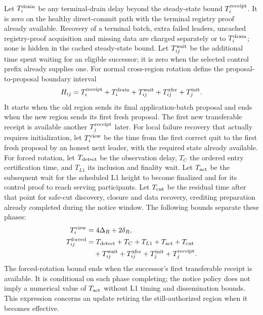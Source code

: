 \documentclass[11pt,a4paper,onecolumn]{article}
\begin{document}
Let $T_i^{\rm drain}$ be any terminal-drain delay beyond the steady-state bound $T_i^{\rm receipt}$.
It is zero on the healthy direct-commit path with the terminal registry
proof already available. Recovery of a terminal batch, extra failed leaders,
uncached registry-proof acquisition and missing data are charged separately
or to $T_i^{\rm drain}$; none is hidden in the cached steady-state bound.
Let $T_{ij}^{\rm wait}$ be the additional time spent waiting for an eligible
successor; it is zero when the selected control prefix already supplies one.
For normal cross-region rotation define the proposal-to-proposal boundary interval
\[
 H_{ij}=T_i^{\rm receipt}+T_i^{\rm drain}+T_{ij}^{\rm wait}+T_{ij}^{\rm xfer}+T_j^{\rm init}.
\]
It starts when the old region sends its final application-batch proposal
and ends when the new region sends its first fresh proposal. The first
new transferable receipt is available another $T_j^{\rm receipt}$ later.
For local failure recovery that actually requires initialization, let $T_i^{\rm view}$ be the time from the first
correct quit to the first fresh proposal by an honest next leader, with
the required state already available. For forced rotation, let
$T_{\rm detect}$ be the observation delay, $T_C$ the ordered entry
certification time, and $T_{L1}$ its inclusion and finality wait.
Let $T_{\rm act}$ be the subsequent wait for the scheduled L1 height to
become finalized and for its control proof to reach serving participants.
Let $T_{\rm cut}$ be the residual time after that point for safe-cut
discovery, closure and data recovery, crediting preparation already
completed during the notice window. The following bounds separate these phases:
\[
 \begin{aligned}
 T_i^{\rm view}&=4\Delta_R+2\delta_R,\\
 T_{ij}^{\rm forced}&=T_{\rm detect}+T_C+T_{L1}+T_{\rm act}+T_{\rm cut}\\
                   &\quad+T_{ij}^{\rm wait}+T_{ij}^{\rm xfer}
                         +T_j^{\rm init}+T_j^{\rm receipt}.
 \end{aligned}
\]
The forced-rotation bound ends when the successor's first transferable
receipt is available. It is conditional on each phase completing; the
notice policy does not imply a numerical value of $T_{\rm act}$ without
L1 timing and dissemination bounds. This expression concerns an update
retiring the still-authorized region when it becomes effective.
\end{document}
